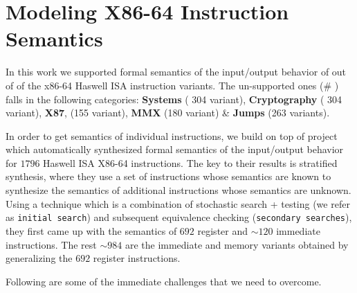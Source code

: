 
\section{Modeling X86-64 Instruction Semantics} \label{sec:modelI}

In this work we supported formal semantics of the input/output behavior of
\supp{} out of \total{}  of the x86-64 Haswell ISA instruction variants.
 The
un-supported ones (\# \unsupp{}) falls in the following  categories:
\textbf{Systems} ( 304 variant), \textbf{Cryptography} ( 304 variant),
  \textbf{X87}, (155 variant), \textbf{MMX} (180 variant) \& \textbf{Jumps} (263
      variants). 



In order to get semantics of individual instructions, we build on top of project
\Strata~\cite{Heule2016a} which automatically synthesized formal semantics  of
the input/output behavior for $1796$ Haswell ISA X86-64 instructions. The key to
their results is stratified synthesis, where they use a set of instructions
whose semantics are known to synthesize the semantics of additional instructions
whose semantics are unknown. Using a  technique which is a combination of
stochastic search + testing (we refer as {\tt initial search}) and subsequent
equivalence checking ({\tt secondary searches}), they first came up with the
semantics of $692$ register and $\sim120$ immediate instructions. The rest
$\sim984$ are the immediate and memory variants obtained by generalizing the
$692$ register instructions.     

Following are some of the immediate challenges that we need to overcome.

